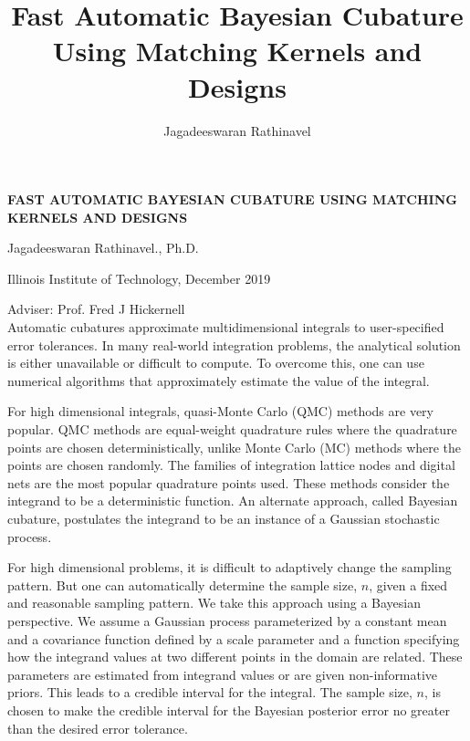 \documentclass[12pt]{report}
\title{
		Fast Automatic Bayesian Cubature Using 
		Matching Kernels and Designs
	}
\author{Jagadeeswaran Rathinavel}
\begin{document}
	\pagestyle{empty}
\noindent
\textbf{FAST AUTOMATIC BAYESIAN CUBATURE USING MATCHING KERNELS AND DESIGNS}

\noindent
Jagadeeswaran Rathinavel., Ph.D.

\noindent
Illinois Institute of Technology, December 2019

\noindent
Adviser: Prof. Fred J Hickernell 
\\ %

	
	Automatic cubatures approximate multidimensional integrals to user-specified error tolerances. 
	In many real-world integration problems, the analytical solution is either unavailable or difficult to compute.
	To overcome this, one can use numerical algorithms that approximately estimate the value of the integral. 
	
	For high dimensional integrals, quasi-Monte Carlo (QMC) methods are very popular.
	QMC methods are equal-weight quadrature rules where the quadrature points are chosen deterministically, unlike Monte Carlo (MC) methods where the points are chosen randomly.
	The families of integration lattice nodes and digital nets are the most popular quadrature points used. 
	These methods consider the integrand to be a deterministic function.
	An alternate approach, called Bayesian cubature, postulates the integrand to be an instance of a Gaussian stochastic process.  
	
	For high dimensional problems, it is difficult to adaptively change the sampling pattern. But one can automatically determine the sample size, $n$, given a fixed and reasonable sampling pattern. We take this approach using a Bayesian perspective.
	We assume a Gaussian process parameterized by a constant mean and a covariance function defined by a scale parameter and a function specifying how the integrand values at two different points in the domain are related.
	These parameters are estimated from integrand values or are given non-informative priors. This leads to a credible interval for the integral.  The sample size, $n$, is chosen to make the credible interval for the Bayesian posterior error no greater than the desired error tolerance. 
	
\end{document}

